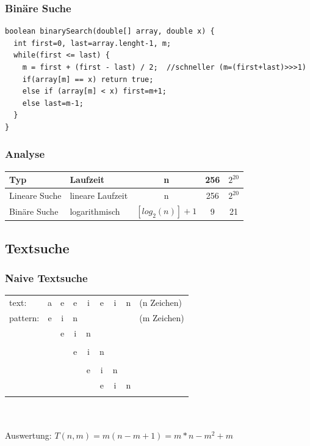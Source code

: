 \documentclass[a4paper,10pt]{article}
\begin{document}
\subsubsection{Bin\"are Suche}
\begin{lstlisting}
boolean binarySearch(double[] array, double x) {
  int first=0, last=array.lenght-1, m;
  while(first <= last) {
    m = first + (first - last) / 2;  //schneller (m=(first+last)>>>1)
    if(array[m] == x) return true;
    else if (array[m] < x) first=m+1;
    else last=m-1;
  }
}
\end{lstlisting}

\subsubsection{Analyse}
\begin{tabular}{l | l | c | c | c }
	Typ & Laufzeit & n & 256 & $2^{20}$ \\
	\hline
	Lineare Suche & lineare Laufzeit & n & 256 & $2^{20}$ \\
	Bin\"are Suche & logarithmisch & $[log_{2}(n)]+1$ & 9 & 21
\end{tabular}

\subsection{Textsuche}
\subsubsection{Naive Textsuche}
\begin{tabular}{l c c c c c c c l}
	text: & a & e & e & i & e & i & n & (n Zeichen) \\
	pattern: & e & i & n & & & & & (m Zeichen) \\
	& \lightning & e & i & n \\
	& & \checkmark & \lightning \\
	& & & e & i & n \\
	& & & \checkmark & \checkmark & \lightning \\
	& & & & e & i & n \\
	& & & & \lightning & e & i & n \\
	& & & & & \checkmark & \checkmark & \checkmark \\
\end{tabular} \\ \\
Auswertung: $T(n,m) = m(n-m+1)=m*n-m^2+m$
\end{document}
